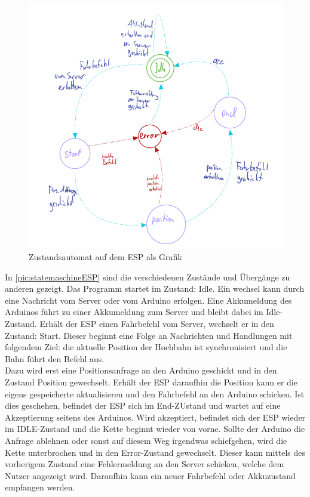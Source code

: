 \begin{figure}[h]
	\begin{center}
		\includegraphics[width=14cm]{stateMaschineESP.PNG}
		\caption{\label{pic:statemaschineESP}Zustandsautomat auf dem ESP als Grafik}
	\end{center}
\end{figure}

In \autoref{pic:statemaschineESP} sind die verschiedenen Zustände und Übergänge zu anderen gezeigt. Das Programm startet im Zustand: Idle. Ein wechsel kann durch eine Nachricht vom Server oder vom Arduino erfolgen. Eine Akkumeldung des Arduinos führt zu einer Akkumeldung zum Server und bleibt dabei im Idle-Zustand.
Erhält der ESP einen Fahrbefehl vom Server, wechselt er in den Zustand: Start. Dieser beginnt eine Folge an Nachrichten und Handlungen mit folgendem Ziel: die aktuelle Position der Hochbahn ist synchronisiert und die Bahn führt den Befehl aus. \\
Dazu wird erst eine Positionsanfrage an den Arduino geschickt und in den Zustand Position gewechselt. Erhält der ESP daraufhin die Position kann er die eigens gespeicherte aktualisieren und den Fahrbefehl an den Arduino schicken. Ist dies geschehen, befindet der ESP sich im End-ZUstand und wartet auf eine Akzeptierung seitens des Arduinos. Wird akzeptiert, befindet sich der ESP wieder im IDLE-Zustand und die Kette beginnt wieder von vorne. Sollte der Arduino die Anfrage ablehnen oder sonst auf diesem Weg irgendwas schiefgehen, wird die Kette unterbrochen und in den Error-Zustand gewechselt. Dieser kann mittels des vorherigem Zustand eine Fehlermeldung an den Server schicken, welche dem Nutzer angezeigt wird. Daraufhin kann ein neuer Fahrbefehl oder Akkuzustand empfangen werden. 

